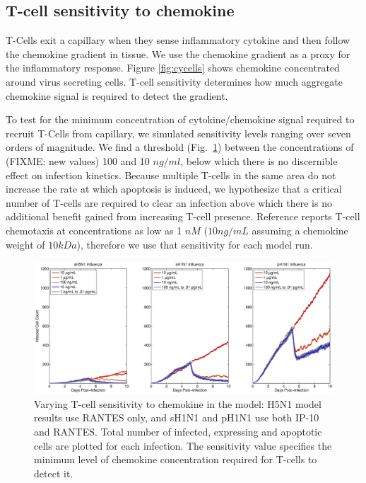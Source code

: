 \documentclass[10pt]{article}
\begin{document}
\subsection*{T-cell sensitivity to chemokine}

T-Cells exit a capillary when they sense inflammatory cytokine and then follow the chemokine gradient in tissue.  We use the chemokine gradient as a proxy for the inflammatory response.  Figure \ref{fig:cycells} shows chemokine concentrated around virus secreting cells.  T-cell sensitivity determines how much aggregate chemokine signal is required to detect the gradient.

To test for the minimum concentration of cytokine/chemokine signal required to recruit T-Cells from capillary, we simulated sensitivity levels ranging over seven orders of magnitude. We find a threshold (Fig.~\ref{fig:sensitivity}) between the concentrations of (FIXME: new values) 100 and 10 $ng/ml$, below which there is no discernible effect on infection kinetics.  Because multiple T-cells in the same area do not increase the rate at which apoptosis is induced, we hypothesize that a critical number of T-cells are required to clear an infection above which there is no additional benefit gained from increasing T-cell presence.  Reference \cite{Gao2003} reports T-cell chemotaxis at concentrations as low as 1 $nM$ ($10 ng/mL$ assuming a chemokine weight of $10 kDa$), therefore we use that sensitivity for each model run.

\begin{figure}[ht!]
\begin{center}
 \includegraphics[width=\textwidth]{sensitivity}
 \end{center}
\caption{Varying T-cell sensitivity to chemokine in the model: H5N1 model results use RANTES  only, and sH1N1 and pH1N1 use both IP-10 and RANTES. Total number of infected, expressing and apoptotic cells are plotted for each infection.  The sensitivity value specifies the minimum level of chemokine concentration required for T-cells to detect it. } 
 \label{fig:sensitivity}
\end{figure}
\end{document}
